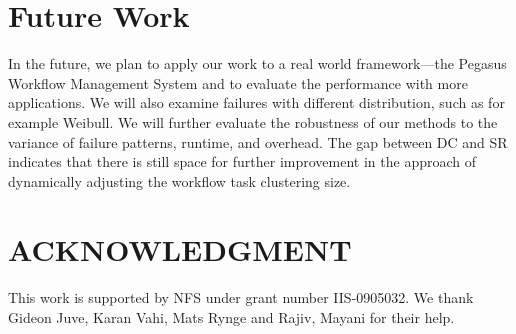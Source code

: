 \documentclass{IOS-Book-Article}
\begin{document}
\section{Future Work}

In the future, we plan to apply our work to a real world framework---the Pegasus Workflow Management System and to evaluate the performance with more applications. We will also examine failures with different distribution, such as for example Weibull.  We will further evaluate the robustness of our methods to the variance of failure patterns, runtime, and overhead. The gap between DC and SR indicates that there is still space for further improvement in the approach of dynamically adjusting the workflow task clustering size. 

\section{ACKNOWLEDGMENT}
This work is supported by NFS under grant number IIS-0905032. We thank Gideon Juve, Karan Vahi, Mats Rynge and Rajiv, Mayani for their help. 




\end{document}
